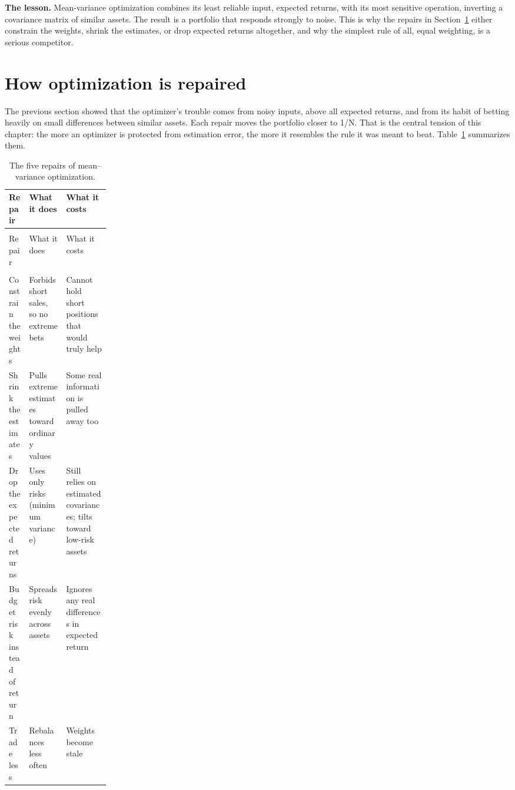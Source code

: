 \textbf{The lesson.} Mean-variance optimization combines its least reliable input, expected returns, with its most sensitive operation, inverting a covariance matrix of similar assets. The result is a portfolio that responds strongly to noise. This is why the repairs in Section~\ref{sec:12-repairs} either constrain the weights, shrink the estimates, or drop expected returns altogether, and why the simplest rule of all, equal weighting, is a serious competitor.


\section{How optimization is repaired}
\label{sec:12-repairs}

The previous section showed that the optimizer's trouble comes from noisy inputs, above all expected returns, and from its habit of betting heavily on small differences between similar assets.
Each repair moves the portfolio closer to 1/N. That is the central tension of this chapter: the more an optimizer is protected from estimation error, the more it resembles the rule it was meant to beat.
Table~\ref{tab:12-repairs} summarizes them.


{\small
\begin{longtable}{@{}>{\raggedright\arraybackslash}p{0.2\linewidth}>{\raggedright\arraybackslash}p{}>{\raggedright\arraybackslash}p{}@{}}
\caption{The five repairs of mean--variance optimization.}
\label{tab:12-repairs} \\
\toprule
Repair & What it does & What it costs \\
\midrule
\endfirsthead
\multicolumn{3}{@{}l}{\emph{Table~\thetable\ (continued)}} \\
\toprule
Repair & What it does & What it costs \\
\midrule
\endhead
\midrule
\multicolumn{3}{r@{}}{\emph{(continued on the next page)}} \\
\endfoot
\bottomrule
\endlastfoot
Constrain the weights & Forbids short sales, so no extreme bets & Cannot hold short positions that would truly help \\
\addlinespace[3pt]
Shrink the estimates & Pulls extreme estimates toward ordinary values & Some real information is pulled away too \\
\addlinespace[3pt]
Drop the expected returns & Uses only risks (minimum variance) & Still relies on estimated covariances; tilts toward low-risk assets \\
\addlinespace[3pt]
Budget risk instead of return & Spreads risk evenly across assets & Ignores any real differences in expected return \\
\addlinespace[3pt]
Trade less & Rebalances less often & Weights become stale \\
\end{longtable}
}


